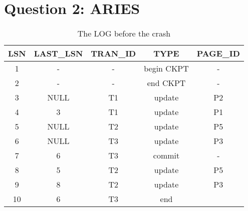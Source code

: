 \documentclass{article}      %
\begin{document}
\section*{Question 2: ARIES}

\begin{table}[h]
\begin{center}
\begin{tabular}{|c|c|c|c|c|}
\hline
\textbf{LSN} & \textbf{LAST\_LSN} & \textbf{TRAN\_ID} & \textbf{TYPE} & \textbf{PAGE\_ID} \\ \hline
1            & -                  & -                 & begin CKPT    & -                 \\ 
2            & -                  & -                 & end CKPT      & -                 \\ 
3            & NULL               & T1                & update        & P2                \\ 
4            & 3                  & T1                & update        & P1                \\ 
5            & NULL               & T2                & update        & P5                \\
6            & NULL               & T3                & update        & P3                \\
7            & 6                  & T3                & commit        & -                 \\ 
8            & 5                  & T2                & update        & P5                \\
9            & 8                  & T2                & update        & P3                \\ 
10           & 6                  & T3                & end           &                   \\ \hline
\end{tabular}
\caption{The LOG before the crash}
\label{The LOG before the crash}
\end{center}
\end{table}
\end{document}
